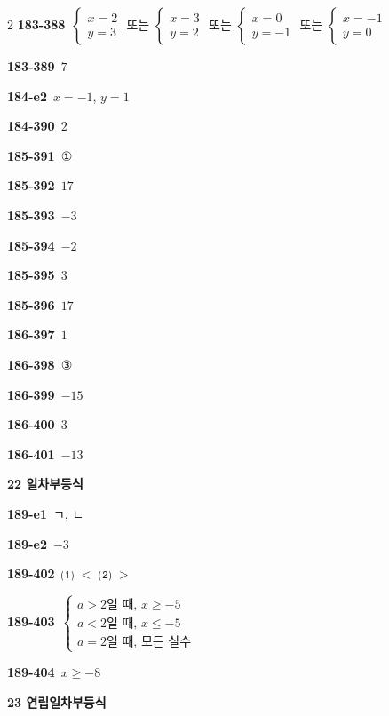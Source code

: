 \documentclass[10pt,a4paper]{article}
\begin{document}
\begin{multicols}{2}
\noindent\textbf{183-388}\ $\begin{cases} x=2 \\ y=3 \end{cases}$ 또는 $\begin{cases} x=3 \\ y=2 \end{cases}$ 또는 $\begin{cases} x=0 \\ y=-1 \end{cases}$ 또는 $\begin{cases} x=-1 \\ y=0 \end{cases}$\par
\noindent\textbf{183-389}\ $7$\par
\noindent\textbf{184-e2}\ $x=-1$, $y=1$\par
\noindent\textbf{184-390}\ $2$\par
\noindent\textbf{185-391}\ ①\par
\noindent\textbf{185-392}\ $17$\par
\noindent\textbf{185-393}\ $-3$\par
\noindent\textbf{185-394}\ $-2$\par
\noindent\textbf{185-395}\ $3$\par
\noindent\textbf{185-396}\ $17$\par
\noindent\textbf{186-397}\ $1$\par
\noindent\textbf{186-398}\ ③\par
\noindent\textbf{186-399}\ $-15$\par
\noindent\textbf{186-400}\ $3$\par
\noindent\textbf{186-401}\ $-13$\par
\noindent\textbf{22 일차부등식}\par\smallskip
\noindent\textbf{189-e1}\ ㄱ, ㄴ\par
\noindent\textbf{189-e2}\ $-3$\par
\noindent\textbf{189-402}\ ⑴ $<$ ⑵ $>$\par
\noindent\textbf{189-403}\ $\begin{cases} a>2\text{일 때, } x\ge -5 \\ a<2\text{일 때, } x\le -5 \\ a=2\text{일 때, 모든 실수} \end{cases}$\par
\noindent\textbf{189-404}\ $x\ge -8$\par
\noindent\textbf{23 연립일차부등식}\par\smallskip

\end{multicols}
\end{document}
